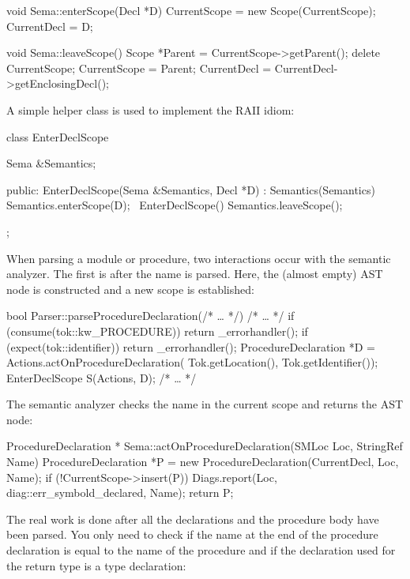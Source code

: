 \begin{cpp}
void Sema::enterScope(Decl *D) {
    CurrentScope = new Scope(CurrentScope);
    CurrentDecl = D;
}

void Sema::leaveScope() {
    Scope *Parent = CurrentScope->getParent();
    delete CurrentScope;
    CurrentScope = Parent;
    CurrentDecl = CurrentDecl->getEnclosingDecl();
}
\end{cpp}

A simple helper class is used to implement the RAII idiom:

\begin{cpp}
class EnterDeclScope {
    Sema &Semantics;

public:
    EnterDeclScope(Sema &Semantics, Decl *D)
    : Semantics(Semantics) {
        Semantics.enterScope(D);
    }
    ~EnterDeclScope() { Semantics.leaveScope(); }
};
\end{cpp}

When parsing a module or procedure, two interactions occur with the semantic analyzer. The first is after the name is parsed. Here, the (almost empty) AST node is constructed and a new scope is established:

\begin{cpp}
bool Parser::parseProcedureDeclaration(/* … */) {
    /* … */
    if (consume(tok::kw_PROCEDURE)) return _errorhandler();
    if (expect(tok::identifier)) return _errorhandler();
    ProcedureDeclaration *D =
        Actions.actOnProcedureDeclaration(
            Tok.getLocation(), Tok.getIdentifier());
    EnterDeclScope S(Actions, D);
    /* … */
}
\end{cpp}

The semantic analyzer checks the name in the current scope and returns the AST node:

\begin{cpp}
ProcedureDeclaration *
Sema::actOnProcedureDeclaration(SMLoc Loc, StringRef Name) {
    ProcedureDeclaration *P =
    new ProcedureDeclaration(CurrentDecl, Loc, Name);
    if (!CurrentScope->insert(P))
        Diags.report(Loc, diag::err_symbold_declared, Name);
    return P;
}
\end{cpp}

The real work is done after all the declarations and the procedure body have been parsed. You only need to check if the name at the end of the procedure declaration is equal to the name of the procedure and if the declaration used for the return type is a type declaration:

